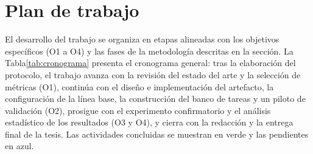 \section{Plan de trabajo}
\label{sec:plan-trabajo}

El desarrollo del trabajo se organiza en etapas alineadas con los objetivos específicos (O1 a O4) y las fases de la metodología descritas en la sección\nobreakspace{}. La Tabla\nobreakspace\ref{tab:cronograma} presenta el cronograma general: tras la elaboración del protocolo, el trabajo avanza con la revisión del estado del arte y la selección de métricas (O1), continúa con el diseño e implementación del artefacto, la configuración de la línea base, la construcción del banco de tareas y un piloto de validación (O2), prosigue con el experimento confirmatorio y el análisis estadístico de los resultados (O3 y O4), y cierra con la redacción y la entrega final de la tesis. Las actividades concluidas se muestran en verde y las pendientes en azul.

\newlength{\gwid}\setlength{\gwid}{0.5cm}
\newlength{\lscw}\setlength{\lscw}{\textheight}
\newcommand{\rot}[1]{\rotatebox[origin=c]{90}{\tiny #1}}

